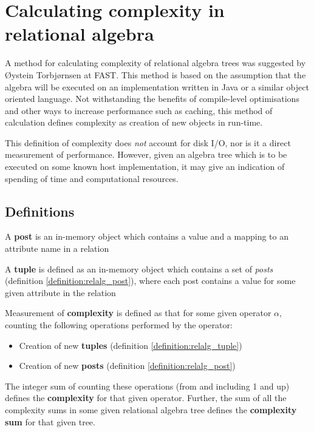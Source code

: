 \section{Calculating complexity in relational algebra}
A method for calculating complexity of relational algebra trees was suggested
by \O ystein Torbj\o rnsen at FAST. This method is based on the assumption
that the algebra will be executed on an implementation written in Java or a
similar object oriented language. Not withstanding the benefits of compile-level
optimisations and other ways to increase performance such as caching, this
method of calculation defines complexity as creation of new objects in run-time. 

This definition of complexity does \textit{not} account
for disk I/O, nor is it a direct measurement of performance. However, given
an algebra tree which is to be executed on some known host implementation, it
may give an indication of spending of time and computational resources.

\subsection{Definitions}
\begin{myDefinition}
A \textbf{post} is an in-memory object which contains a value and a mapping to
an attribute name in a relation
\label{definition:relalg_post}
\end{myDefinition}

\begin{myDefinition}
A \textbf{tuple} is defined as an in-memory object which contains a set of
\textit{posts} (definition \ref{definition:relalg_post}), where each post
contains a value for some given attribute in the relation
\label{definition:relalg_tuple}
\end{myDefinition}

\begin{myDefinition}
Measurement of \textbf{complexity} is defined as that for some given operator
$\alpha$, counting the following operations performed by the operator:
\begin{itemize}
  \item Creation of new \textbf{tuples} (definition
  \ref{definition:relalg_tuple})
  \item Creation of new \textbf{posts} (definition \ref{definition:relalg_post})
\end{itemize}
The integer sum of counting these operations (from and including 1 and up)
defines the \textbf{complexity} for that given operator. Further, the sum of
all the complexity sums in some given relational algebra tree defines the
\textbf{complexity sum} for that given tree.
\label{definition:relalg_complexity}
\end{myDefinition}

